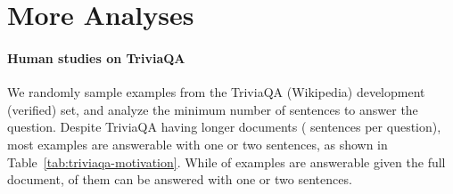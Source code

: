 \documentclass[11pt,a4paper]{article}
\newcommand{\full}{\textsc{Full}}
\newcommand{\ours}{\textsc{Minimal}}
\newcommand{\venndiagram}{Venn diagram}
\begin{document}
 \section{More Analyses}\label{sec:app-analysis}\paragraph{Human studies on TriviaQA}
We randomly sample  examples from the TriviaQA (Wikipedia) development (verified) set, and analyze the minimum number of sentences to answer the question.
Despite TriviaQA having longer documents ( sentences per question), most examples are answerable with one or two sentences, as shown in Table~\ref{tab:triviaqa-motivation}.
While  of examples are answerable given the full document,  of them can be answered with one or two sentences.

\begin{figure*}[pht]
\centering
{}
\caption{
(Left) \venndiagram of the questions answered correctly by \full~and with \ours. (Middle and Right) Error cases from \full~(Middle) and \ours~(Right), broken down by which sentence the model's prediction comes from.
}
\label{fig:squad-error-analysis}
\end{figure*}
\end{document}
